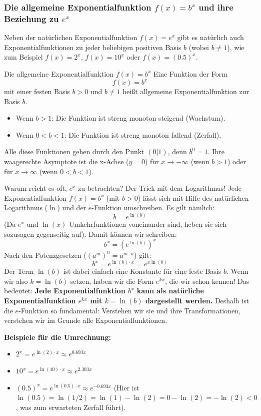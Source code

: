 
\subsubsection{Die allgemeine Exponentialfunktion $f(x) = b^x$ und ihre Beziehung zu $e^x$}
\label{subsubsec:allgemeine_basis_b}

Neben der natürlichen Exponentialfunktion $f(x)=e^x$ gibt es natürlich auch Exponentialfunktionen zu jeder beliebigen positiven Basis $b$ (wobei $b \neq 1$), wie zum Beispiel $f(x)=2^x$, $f(x)=10^x$ oder $f(x)=(0.5)^x$.

\begin{merksatzumgebung}{Die allgemeine Exponentialfunktion $f(x)=b^x$}
Eine Funktion der Form
\[ f(x) = b^x \]
mit einer festen Basis $b > 0$ und $b \neq 1$ heißt allgemeine Exponentialfunktion zur Basis $b$.
\begin{itemize}
    \item Wenn $b > 1$: Die Funktion ist streng monoton steigend (Wachstum).
    \item Wenn $0 < b < 1$: Die Funktion ist streng monoton fallend (Zerfall).
\end{itemize}
Alle diese Funktionen gehen durch den Punkt $(0|1)$, denn $b^0=1$.
Ihre waagerechte Asymptote ist die x-Achse ($y=0$) für $x \to -\infty$ (wenn $b>1$) oder für $x \to \infty$ (wenn $0<b<1$).
\end{merksatzumgebung}

\begin{infoboxumgebung}{Warum reicht es oft, $e^x$ zu betrachten? Der Trick mit dem Logarithmus!}
Jede Exponentialfunktion $f(x)=b^x$ (mit $b>0$) lässt sich mit Hilfe des natürlichen Logarithmus ($\ln$) und der $e$-Funktion umschreiben. Es gilt nämlich:
\[ b = e^{\ln(b)} \]
(Da $e^x$ und $\ln(x)$ Umkehrfunktionen voneinander sind, heben sie sich sozusagen gegenseitig auf).
Damit können wir schreiben:
\[ b^x = (e^{\ln(b)})^x \]
Nach den Potenzgesetzen ($(a^m)^n = a^{m \cdot n}$) gilt:
\[ b^x = e^{\ln(b) \cdot x} = e^{x \ln(b)} \]
Der Term $\ln(b)$ ist dabei einfach eine Konstante für eine feste Basis $b$. Wenn wir also $k = \ln(b)$ setzen, haben wir die Form $e^{kx}$, die wir schon kennen!
Das bedeutet: \textbf{Jede Exponentialfunktion $b^x$ kann als natürliche Exponentialfunktion $e^{kx}$ mit $k=\ln(b)$ dargestellt werden.}
Deshalb ist die $e$-Funktion so fundamental: Verstehen wir sie und ihre Transformationen, verstehen wir im Grunde alle Exponentialfunktionen.

\textbf{Beispiele für die Umrechnung:}
\begin{itemize}
    \item $2^x = e^{\ln(2) \cdot x} \approx e^{0.693x}$
    \item $10^x = e^{\ln(10) \cdot x} \approx e^{2.303x}$
    \item $(0.5)^x = e^{\ln(0.5) \cdot x} \approx e^{-0.693x}$ (Hier ist $\ln(0.5) = \ln(1/2) = \ln(1)-\ln(2) = 0-\ln(2) = -\ln(2) < 0$, was zum erwarteten Zerfall führt).
\end{itemize}
\end{infoboxumgebung}

